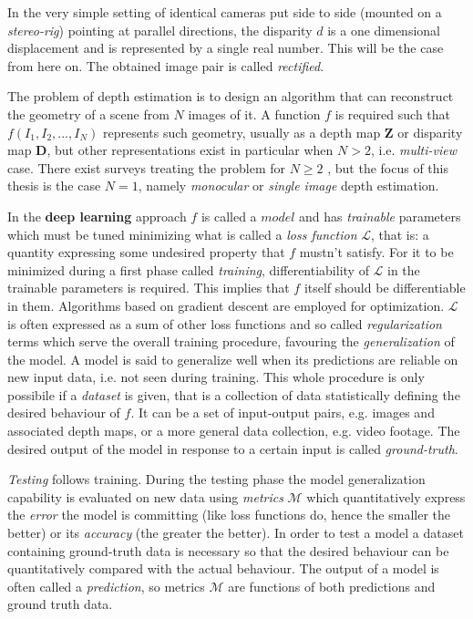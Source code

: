 In the very simple setting of identical cameras put side to side (mounted on a \textit{stereo-rig}) pointing at parallel directions, the disparity $d$ is a one dimensional displacement and is represented by a single real number.
This will be the case from here on. The obtained image pair is called \textit{rectified}.


The problem of depth estimation is to design an algorithm that can reconstruct the geometry of a scene from $N$ images of it.
A function $f$ is required such that $f(I_{1}, I_{2}, ..., I_{N})$ represents such geometry, usually as a depth map $\mathbf{Z}$ or disparity map $\mathbf{D}$, but other representations exist in particular when $N > 2$, i.e. \textit{multi-view} case.
There exist surveys treating the problem for $N \geq 2$ \cite{correspondance, stereo}, but the focus of this thesis is the case $N = 1$, namely \textit{monocular} or \textit{single image} depth estimation.


In the \textbf{deep learning} approach $f$ is called a $model$ and has \textit{trainable} parameters which must be tuned minimizing what is called a \textit{loss function} $\mathcal{L}$, that is: a quantity expressing some undesired property that $f$ mustn't satisfy.
For it to be minimized during a first phase called \textit{training}, differentiability of $\mathcal{L}$ in the trainable parameters is required.
This implies that $f$ itself should be differentiable in them.
Algorithms based on gradient descent are employed for optimization.
$\mathcal{L}$ is often expressed as a sum of other loss functions and so called \textit{regularization} terms which serve the overall training procedure, favouring the \textit{generalization} of the model.
A model is said to generalize well when its predictions are reliable on new input data, i.e. not seen during training.
This whole procedure is only possibile if a \textit{dataset} is given, that is a collection of data statistically defining the desired behaviour of $f$.
It can be a set of input-output pairs, e.g. images and associated depth maps, or a more general data collection, e.g. video footage.
The desired output of the model in response to a certain input is called \textit{ground-truth}.

\textit{Testing} follows training.
During the testing phase the model generalization capability is evaluated on new data using \textit{metrics} $\mathcal{M}$ which quantitatively express the \textit{error} the model is committing (like loss functions do, hence the smaller the better) or its \textit{accuracy} (the greater the better).
In order to test a model a dataset containing ground-truth data is necessary so that the desired behaviour can be quantitatively compared with the actual behaviour.
The output of a model is often called a \textit{prediction}, so metrics $\mathcal{M}$ are functions of both predictions and ground truth data.


